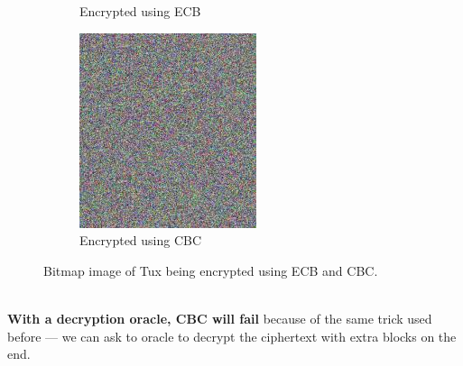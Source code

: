 \begin{figure}[htp!]
\begin{subfigure}[b]{0.3\textwidth}
            \caption{Encrypted using ECB}
        \end{subfigure}
        \begin{subfigure}[b]{0.3\textwidth}
            \centering
            \includegraphics[width=\textwidth]{img/Tux_secure.jpg}
            \caption{Encrypted using CBC}
        \end{subfigure}
        \caption{Bitmap image of Tux being encrypted using ECB and CBC.}
        \label{fig:tux}
    \end{figure}
    \\
    \textbf{With a decryption oracle, CBC will fail} because of the same trick used before --- we can ask to oracle to decrypt the ciphertext with extra blocks on the end.
    
    
    
